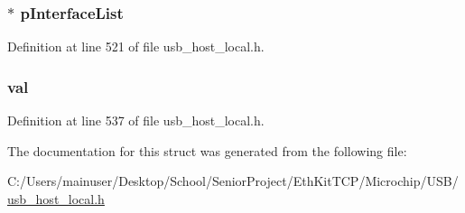 \subsubsection[{p\+Interface\+List}]{$\ast$ p\+Interface\+List}\label{struct___u_s_b___d_e_v_i_c_e___i_n_f_o_a3858a517074df05e06ca0e9fe78bf525}


Definition at line 521 of file usb\+\_\+host\+\_\+local.\+h.

\hypertarget{struct___u_s_b___d_e_v_i_c_e___i_n_f_o_a1ba23d624885cedce131033610c85094}{}
\subsubsection[{val}]{ val}\label{struct___u_s_b___d_e_v_i_c_e___i_n_f_o_a1ba23d624885cedce131033610c85094}


Definition at line 537 of file usb\+\_\+host\+\_\+local.\+h.



The documentation for this struct was generated from the following file\+:\begin{DoxyCompactItemize}
\item 
C\+:/\+Users/mainuser/\+Desktop/\+School/\+Senior\+Project/\+Eth\+Kit\+T\+C\+P/\+Microchip/\+U\+S\+B/\hyperlink{usb__host__local_8h}{usb\+\_\+host\+\_\+local.\+h}\end{DoxyCompactItemize}
